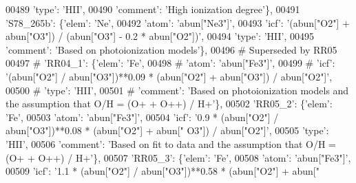 \begin{DoxyCode}
00489                                    \textcolor{stringliteral}{'type'}: \textcolor{stringliteral}{'HII'},
00490                                    \textcolor{stringliteral}{'comment'}: \textcolor{stringliteral}{'High ionization degree'}\},
00491                          \textcolor{stringliteral}{'S78\_265b'}: \{\textcolor{stringliteral}{'elem'}: \textcolor{stringliteral}{'Ne'},
00492                                       \textcolor{stringliteral}{'atom'}: \textcolor{stringliteral}{'abun["Ne3"]'},
00493                                       \textcolor{stringliteral}{'icf'}: \textcolor{stringliteral}{'(abun["O2"] + abun["O3"]) / (abun["O3"] - 0.2 * abun["O2"])'},
00494                                       \textcolor{stringliteral}{'type'}: \textcolor{stringliteral}{'HII'},
00495                                       \textcolor{stringliteral}{'comment'}: \textcolor{stringliteral}{'Based on photoionization models'}\},
00496 \textcolor{comment}{# Superseded by RR05}
00497 \textcolor{comment}{#                         'RR04\_1': \{'elem': 'Fe',}
00498 \textcolor{comment}{#                                      'atom': 'abun["Fe3"]',}
00499 \textcolor{comment}{#                                      'icf': '(abun["O2"] / abun["O3"])**0.09 * (abun["O2"] + abun["O3"])
       / abun["O2"]',}
00500 \textcolor{comment}{#                                      'type': 'HII',}
00501 \textcolor{comment}{#                                      'comment': 'Based on photoionization models and the assumption that
       O/H = (O+ + O++) / H+'\},}
00502                          \textcolor{stringliteral}{'RR05\_2'}: \{\textcolor{stringliteral}{'elem'}: \textcolor{stringliteral}{'Fe'},
00503                                       \textcolor{stringliteral}{'atom'}: \textcolor{stringliteral}{'abun["Fe3"]'},
00504                                       \textcolor{stringliteral}{'icf'}: \textcolor{stringliteral}{'0.9 * (abun["O2"] / abun["O3"])**0.08 * (abun["O2"] + abun["
      O3"]) / abun["O2"]'},
00505                                       \textcolor{stringliteral}{'type'}: \textcolor{stringliteral}{'HII'},
00506                                       \textcolor{stringliteral}{'comment'}: \textcolor{stringliteral}{'Based on fit to data and the assumption that O/H = (O+ +
       O++) / H+'}\},
00507                          \textcolor{stringliteral}{'RR05\_3'}: \{\textcolor{stringliteral}{'elem'}: \textcolor{stringliteral}{'Fe'},
00508                                       \textcolor{stringliteral}{'atom'}: \textcolor{stringliteral}{'abun["Fe3"]'},
00509                                       \textcolor{stringliteral}{'icf'}: \textcolor{stringliteral}{'1.1 * (abun["O2"] / abun["O3"])**0.58 * (abun["O2"] + abun["
}
\end{DoxyCode}
